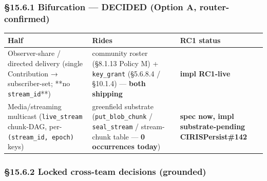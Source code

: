 \documentclass[10pt]{article}
\begin{document}
\subsubsection*{§15.6.1 Bifurcation — DECIDED (Option A, router-confirmed)}


{\footnotesize
\begin{longtable}{|p{5.33cm}|p{5.33cm}|p{5.33cm}|}\hline
\textbf{Half} & \textbf{Rides} & \textbf{RC1 status} \\ \hline\endhead
Observer-share / directed delivery (single Contribution → subscriber-set; **no \texttt{stream\_id}**) & community roster (§8.1.13 Policy M) + \texttt{key\_grant} (§5.6.8.4 / §10.1.4) — \textbf{both shipping} & \textbf{impl RC1-live} \\ \hline
Media/streaming multicast (\texttt{live\_stream} chunk-DAG, per-\texttt{(stream\_id, epoch)} keys) & greenfield substrate (\texttt{put\_blob\_chunk} / \texttt{seal\_stream} / stream-chunk table — \textbf{0 occurrences today}) & \textbf{spec now, impl substrate-pending CIRISPersist\#142} \\ \hline
\end{longtable}}


\subsubsection*{§15.6.2 Locked cross-team decisions (grounded)}
\end{document}

